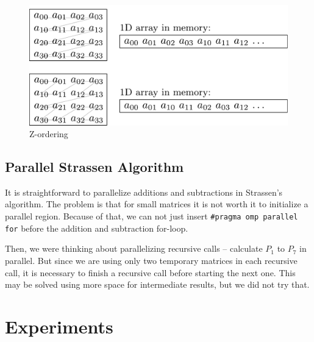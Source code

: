 \documentclass{article}
\begin{document}
\begin{figure}[htbp]
\centerline{\includegraphics[scale=.3]{mem_ordering.pdf}}
\caption{Z-ordering}
\label{fig}
\end{figure}

\subsection{Parallel Strassen Algorithm}

It is straightforward to parallelize additions and subtractions in Strassen’s algorithm.
The problem is that for small matrices it is not worth it to initialize a parallel region.
Because of that, we can not just insert \texttt{\#pragma omp parallel for} before
the addition and subtraction for-loop. 

Then, we were thinking about parallelizing recursive calls -- calculate $P_1$ to $P_7$ in parallel.
But since we are using only two temporary matrices in each recursive call, it is necessary to finish
a recursive call before starting the next one. This may be solved using more space for intermediate
results, but we did not try that.

\section{Experiments}
	
\end{document}
